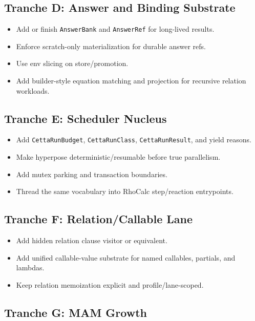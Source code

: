 \documentclass[11pt]{article}
\newcommand{\RhoCalc}{RhoCalc}
\newcommand{\AnswerBank}{\texttt{AnswerBank}}
\newcommand{\AnswerRef}{\texttt{AnswerRef}}
\newcommand{\RunBudget}{\texttt{CettaRunBudget}}
\newcommand{\RunClass}{\texttt{CettaRunClass}}
\newcommand{\RunResult}{\texttt{CettaRunResult}}
\begin{document}
\subsection{Tranche D: Answer and Binding Substrate}

\begin{itemize}[leftmargin=*]
  \item Add or finish \AnswerBank{} and \AnswerRef{} for long-lived results.
  \item Enforce scratch-only materialization for durable answer refs.
  \item Use env slicing on store/promotion.
  \item Add builder-style equation matching and projection for recursive relation workloads.
\end{itemize}

\subsection{Tranche E: Scheduler Nucleus}

\begin{itemize}[leftmargin=*]
  \item Add \RunBudget{}, \RunClass{}, \RunResult{}, and yield reasons.
  \item Make hyperpose deterministic/resumable before true parallelism.
  \item Add mutex parking and transaction boundaries.
  \item Thread the same vocabulary into \RhoCalc{} step/reaction entrypoints.
\end{itemize}

\subsection{Tranche F: Relation/Callable Lane}

\begin{itemize}[leftmargin=*]
  \item Add hidden relation clause visitor or equivalent.
  \item Add unified callable-value substrate for named callables, partials, and lambdas.
  \item Keep relation memoization explicit and profile/lane-scoped.
\end{itemize}

\subsection{Tranche G: MAM Growth}
\end{document}
